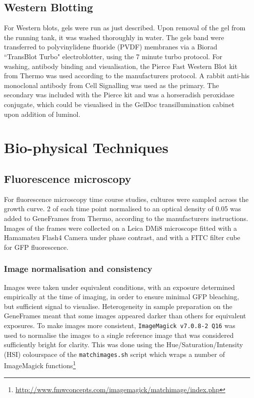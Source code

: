 \subsection{Western Blotting}
For Western blots, gels were run as just described. Upon removal of the gel from the running tank, it was washed thoroughly in water. The gels band were transferred to polyvinylidene fluoride (PVDF) membranes via a Biorad ``TransBlot Turbo" electroblotter, using the 7 minute turbo protocol. For washing, antibody binding and visualisation, the Pierce Fast Western Blot kit from Thermo was used according to the manufacturers protocol. A rabbit anti-his monoclonal antibody from Cell Signalling was used as the primary. The secondary was included with the Pierce kit and was a horseradish peroxidase conjugate, which could be visualised in the GelDoc transillumination cabinet upon addition of luminol.


\section{Bio-physical Techniques}
\subsection{Fluorescence microscopy}
For fluorescence microscopy time course studies, cultures were sampled across the growth curve. 2\ul{} of each time point normalised to an optical density of 0.05 was added to GeneFrames from Thermo, according to the manufacturers instructions. Images of the frames were collected on a Leica DMi8 microscope fitted with a Hamamatsu Flash4 Camera under phase contrast, and with a FITC filter cube for GFP fluorescence.
\subsubsection{Image normalisation and consistency}
Images were taken under equivalent conditions, with an exposure determined empirically at the time of imaging, in order to ensure minimal GFP bleaching, but sufficient signal to visualise. Heterogeneity in sample preparation on the GeneFrames meant that some images appeared darker than others for equivalent exposures. To make images more consistent, \texttt{ImageMagick v7.0.8-2 Q16} was used to normalise the images to a single reference image that was considered sufficiently bright for clarity. This was done using the Hue/Saturation/Intensity (HSI) colourspace of the \texttt{matchimages.sh} script which wraps a number of ImageMagick functions\footnote{\url{http://www.fmwconcepts.com/imagemagick/matchimage/index.php}}

